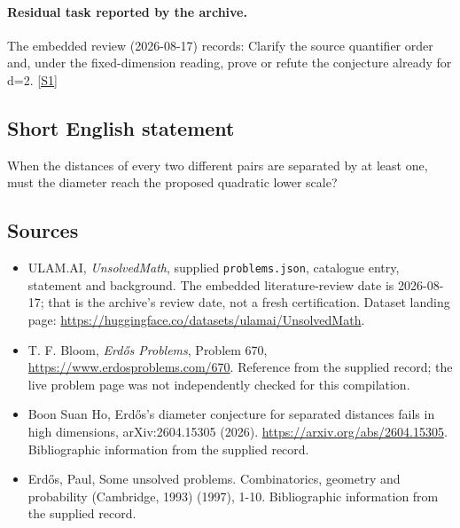 \documentclass[11pt,a4paper]{article}
\newcommand{\sref}[2]{\hyperlink{source:#1:#2}{[S#2]}}
\begin{document}
\paragraph{Residual task reported by the archive.}

The embedded review (2026-08-17) records: Clarify the source quantifier order and, under the fixed-dimension reading, prove or refute the conjecture already for d=2. \sref{statement}{1}

\subsection{Short English statement}

When the distances of every two different pairs are separated by at least one, must the diameter reach the proposed quadratic lower scale?

\subsection{Sources}

{\small

\begin{itemize}

\item[\hypertarget{source:statement:1}{S1}] ULAM.AI, \emph{UnsolvedMath}, supplied \texttt{problems.json}, catalogue entry, statement and background. The embedded literature-review date is 2026-08-17; that is the archive’s review date, not a fresh certification. Dataset landing page: \url{https://huggingface.co/datasets/ulamai/UnsolvedMath}.

\item[\hypertarget{source:statement:2}{S2}] T. F. Bloom, \emph{Erdős Problems}, Problem 670, \url{https://www.erdosproblems.com/670}. Reference from the supplied record; the live problem page was not independently checked for this compilation.

\item[\hypertarget{source:statement:3}{S3}] Boon Suan Ho, Erdős's diameter conjecture for separated distances fails in high dimensions, arXiv:2604.15305 (2026). \url{https://arxiv.org/abs/2604.15305}. Bibliographic information from the supplied record.

\item[\hypertarget{source:statement:4}{S4}] Erd\H{o}s, Paul, Some unsolved problems. Combinatorics, geometry and probability (Cambridge, 1993) (1997), 1-10. Bibliographic information from the supplied record.

\end{itemize}

}

\label{end:statement}
\end{document}
